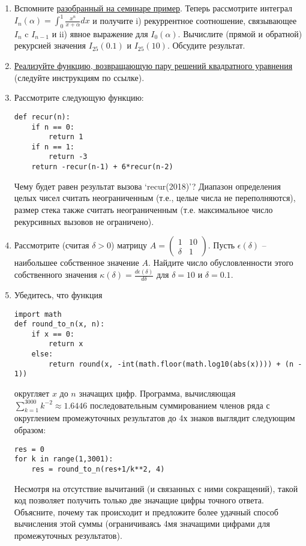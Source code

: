 \documentclass[10pt]{article}
\begin{document}
\begin{enumerate}
\item Вспомните \href{https://github.com/ev-br/CP2020/blob/master/week_0_recurrence.ipynb}{разобранный на семинаре пример}. Теперь рассмотрите интеграл $I_n(\alpha) = \int_0^1 \frac{x^n}{x+\alpha} dx$ и получите i) рекуррентное соотношение, связывающее $I_{n}$ c $I_{n-1}$ и ii) явное выражение для $I_0(\alpha)$. Вычислите (прямой и обратной) рекурсией значения $I_{25}(0.1)$ и $I_{25}(10)$. Обсудите результат.
\item \href{https://github.com/ev-br/CP2020/blob/master/week_1_quadratic.ipynb}{Реализуйте функцию, возвращающую пару решений квадратного уравнения} (следуйте инструкциям по ссылке).
\item Рассмотрите следующую функцию:
\lstset{language=Python}
\lstset{frame=lines}
\lstset{basicstyle=\ttfamily}
\begin{lstlisting}
def recur(n):
    if n == 0:
        return 1
    if n == 1:
        return -3
    return -recur(n-1) + 6*recur(n-2)
\end{lstlisting}

Чему будет равен результат вызова `recur(2018)'? Диапазон определения целых чисел считать неограниченным (т.е., целые числа не переполняются), размер стека также считать неограниченным (т.е. максимальное число рекурсивных вызовов не ограничено).
\item Рассмотрите (считая $\delta>0$) матрицу $A=\begin{pmatrix}
1 & 10 \\
\delta &1 
\end{pmatrix}$. Пусть $\epsilon(\delta)$ -- наибольшее собственное значение $A$. Найдите число обусловленности этого собственного значения $\kappa(\delta)=\frac{d\epsilon(\delta)}{d\delta}$ для $\delta=10$ и $\delta=0.1$.

\item Убедитесь, что функция
\lstset{language=Python}
\lstset{frame=lines}
\lstset{basicstyle=\ttfamily}
\begin{lstlisting}
import math
def round_to_n(x, n): 
    if x == 0:
        return x
    else:
        return round(x, -int(math.floor(math.log10(abs(x)))) + (n - 1))
\end{lstlisting}
округляет $x$ до $n$ значащих цифр.
Программа, вычисляющая $\sum_{k=1}^{3000}k^{-2}\approx 1.6446$ последовательным суммированием членов ряда с округлением промежуточных результатов до 4х знаков выглядит следующим образом:
\lstset{language=Python}
\lstset{frame=lines}
\lstset{basicstyle=\ttfamily}
\begin{lstlisting}
res = 0
for k in range(1,3001):
    res = round_to_n(res+1/k**2, 4)
\end{lstlisting}
Несмотря на отсутствие вычитаний (и связанных с ними сокращений), такой код позволяет получить только две значащие цифры точного ответа. Объясните, почему так происходит и предложите более удачный способ вычисления этой суммы (ограничиваясь 4мя значащими цифрами для промежуточных результатов).
\end{enumerate}
\end{document}
